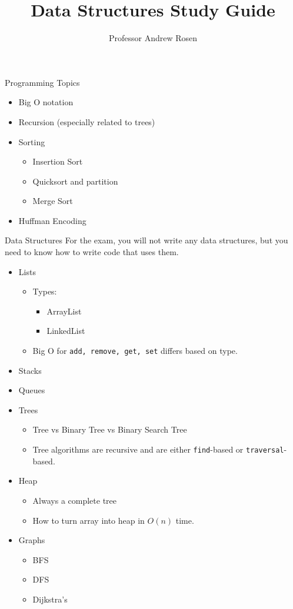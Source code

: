 \documentclass[]{article}
\title{Data Structures Study Guide}
\author{Professor Andrew Rosen}
\begin{document}
\maketitle

Programming Topics
\begin{itemize}
	\item Big O notation
	\item Recursion (especially related to trees)
	\item Sorting
	\begin{itemize}
		\item Insertion Sort
		\item Quicksort and partition
		\item Merge Sort
	\end{itemize}
	\item Huffman Encoding
\end{itemize}



Data Structures
For the exam, you will not write any data structures, but you need to know how to write code that uses them.
\begin{itemize}
	\item Lists
	\begin{itemize}
		\item Types:
		\begin{itemize}
			\item ArrayList
			\item LinkedList
		\end{itemize}
		\item Big O for \texttt{add, remove, get, set} differs based on type.
	\end{itemize}
	\item Stacks
	\item Queues
	\item Trees
	\begin{itemize}
		\item Tree vs Binary Tree vs Binary Search Tree
		\item Tree algorithms are recursive and are either \texttt{find}-based or \texttt{traversal}-based.
	\end{itemize}
	\item Heap
	\begin{itemize}
		\item Always a complete tree
		\item How to turn array into heap in $ O(n) $ time.
	\end{itemize}
	\item Graphs
	\begin{itemize}
		\item BFS
		\item DFS
		\item Dijkstra's
	\end{itemize}
\end{itemize}
\end{document}
